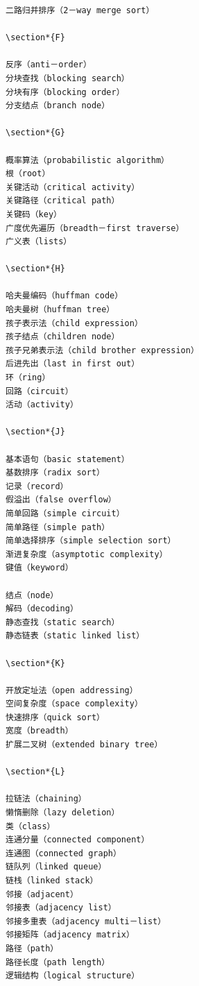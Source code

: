 \documentclass[10pt]{article}
\begin{document}
\begin{verbatim}
二路归并排序（2－way merge sort）

\section*{F}

反序（anti－order）
分块查找（blocking search）
分块有序（blocking order）
分支结点（branch node）

\section*{G}

概率算法（probabilistic algorithm）
根（root）
关键活动（critical activity）
关键路径（critical path）
关键码（key）
广度优先遍历（breadth－first traverse）
广义表（lists）

\section*{H}

哈夫曼编码（huffman code）
哈夫曼树（huffman tree）
孩子表示法（child expression）
孩子结点（children node）
孩子兄弟表示法（child brother expression）
后进先出（last in first out）
环（ring）
回路（circuit）
活动（activity）

\section*{J}

基本语句（basic statement）
基数排序（radix sort）
记录（record）
假溢出（false overflow）
简单回路（simple circuit）
简单路径（simple path）
简单选择排序（simple selection sort）
渐进复杂度（asymptotic complexity）
键值（keyword）

结点（node）
解码（decoding）
静态查找（static search）
静态链表（static linked list）

\section*{K}

开放定址法（open addressing）
空间复杂度（space complexity）
快速排序（quick sort）
宽度（breadth）
扩展二叉树（extended binary tree）

\section*{L}

拉链法（chaining）
懒惰删除（lazy deletion）
类（class）
连通分量（connected component）
连通图（connected graph）
链队列（linked queue）
链栈（linked stack）
邻接（adjacent）
邻接表（adjacency list）
邻接多重表（adjacency multi－list）
邻接矩阵（adjacency matrix）
路径（path）
路径长度（path length）
逻辑结构（logical structure）


\end{verbatim}
\end{document}
